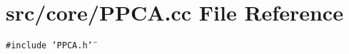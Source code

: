 \section{src/core/PPCA.cc File Reference}
\label{PPCA_8cc}


{\tt \#include \char`\"{}PPCA.h\char`\"{}}\par

